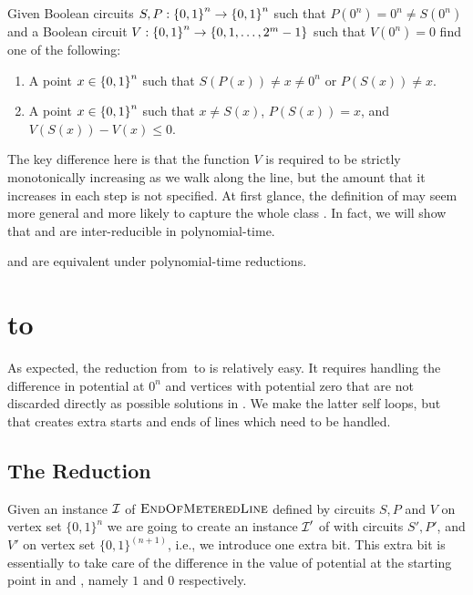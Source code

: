 \begin{definition}[\EOPL]
\label{def:EOPL}
Given Boolean circuits $S,P : \left\{ 0,1 \right\}^n \to \left\{ 0,1 \right\}^n$ such that $P(0^n) =0^n\neq S(0^n)$ and a Boolean circuit $V: \left\{ 0,1 \right\}^n \to \left\{ 0,1,\dotsc,2^m - 1 \right\}$ such that $V(0^n) = 0$ find one of the following:
\begin{enumerate}[label=(R\arabic*)]
\item A point $x \in \left\{ 0,1 \right\}^n$ such that $S(P(x)) \neq x \neq 0^n$ or $P(S(x)) \neq x$.
\item A point $x \in \left\{ 0,1 \right\}^n$ such that $x \neq S(x)$, $P(S(x)) = x$, and $V(S(x)) - V(x) \leq 0$.
\end{enumerate}
\end{definition}

The key difference here is that the function $V$ is required to be strictly
monotonically increasing as we walk along the line, but the amount that it
increases in each step is not specified.
At first glance, the definition of \EOPL may seem more general and more likely to 
capture the whole class \CLS. In fact, we will show that \EOML and \EOPL are 
inter-reducible in polynomial-time.
%
\begin{theorem}
\EOML and \EOPL are equivalent under polynomial-time reductions.
\end{theorem}

\section{\EOML to \EOPL}

As expected, the reduction from~\EOML to \EOPL is relatively easy. It requires
handling the difference in potential at $0^n$ and vertices with potential zero that
are not discarded directly as possible solutions in \EOPL. We make the latter
self loops, but that creates extra starts and ends of lines which need to be
handled.

\subsection{The Reduction}

Given an instance $\mbox{${\mathcal I}$}$ of $\textsc{EndOfMeteredLine}$ defined by circuits $S,P$ and $V$ on vertex
set $\{0,1\}^n$ we are going to create an instance $\mbox{${\mathcal I}$}'$ of \EOPL with circuits
$S',P'$, and $V'$ on vertex set $\{0,1\}^{(n+1)}$, i.e., we introduce one extra bit.  
This extra bit is essentially to take care of the difference in the value of potential 
at the starting point in \EOML and \EOPL, namely $1$ and $0$ respectively. 

